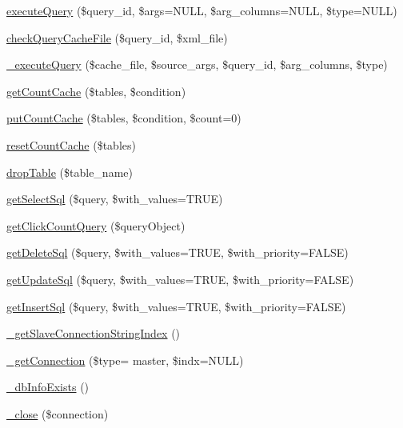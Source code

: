 \begin{DoxyCompactItemize}
\item 
\hyperlink{classDB_a4541040cbc3f33b059bafd66f8cb0ada}{execute\+Query} (\$query\+\_\+id, \$args=N\+U\+LL, \$arg\+\_\+columns=N\+U\+LL, \$type=N\+U\+LL)
\item 
\hyperlink{classDB_a0bbeb84cee13c54916b7f9aac6db4791}{check\+Query\+Cache\+File} (\$query\+\_\+id, \$xml\+\_\+file)
\item 
\hyperlink{classDB_abb9920613c642481dc4c7b5f6f8fe9b2}{\+\_\+execute\+Query} (\$cache\+\_\+file, \$source\+\_\+args, \$query\+\_\+id, \$arg\+\_\+columns, \$type)
\item 
\hyperlink{classDB_af638cf3ae9ad406810b2f8c2d322225c}{get\+Count\+Cache} (\$tables, \$condition)
\item 
\hyperlink{classDB_a90771d4eaa0ff60a1ddbeb338f2ab801}{put\+Count\+Cache} (\$tables, \$condition, \$count=0)
\item 
\hyperlink{classDB_a8167fd227a1955f8300c0d0e70dd9d9e}{reset\+Count\+Cache} (\$tables)
\item 
\hyperlink{classDB_a63a3a5bdc8e30e1cee37cefddd5ce8de}{drop\+Table} (\$table\+\_\+name)
\item 
\hyperlink{classDB_a5324aefa22399846c6a7fb8afeb6e55d}{get\+Select\+Sql} (\$query, \$with\+\_\+values=T\+R\+UE)
\item 
\hyperlink{classDB_a75a6b61801ef6ed2bbf092f1333a8ccd}{get\+Click\+Count\+Query} (\$query\+Object)
\item 
\hyperlink{classDB_aeb58bf0e323895cdc7eda34f09254ed6}{get\+Delete\+Sql} (\$query, \$with\+\_\+values=T\+R\+UE, \$with\+\_\+priority=F\+A\+L\+SE)
\item 
\hyperlink{classDB_ac467d003673def17f4d397e3f25bcf84}{get\+Update\+Sql} (\$query, \$with\+\_\+values=T\+R\+UE, \$with\+\_\+priority=F\+A\+L\+SE)
\item 
\hyperlink{classDB_a2664c0b5ba2bc70d02504ebf343e913e}{get\+Insert\+Sql} (\$query, \$with\+\_\+values=T\+R\+UE, \$with\+\_\+priority=F\+A\+L\+SE)
\item 
\hyperlink{classDB_a8dc4e826557c3de0d49adf7e6112bfea}{\+\_\+get\+Slave\+Connection\+String\+Index} ()
\item 
\hyperlink{classDB_a52b496d073cecfd2ca6e14897b559819}{\+\_\+get\+Connection} (\$type= \textquotesingle{}master\textquotesingle{}, \$indx=N\+U\+LL)
\item 
\hyperlink{classDB_a3bbfb0e7579e8d6fc27a20c1219bb693}{\+\_\+db\+Info\+Exists} ()
\item 
\hyperlink{classDB_a8c161612a558f47fb008dec4b46ee05c}{\+\_\+close} (\$connection)

\end{DoxyCompactItemize}
